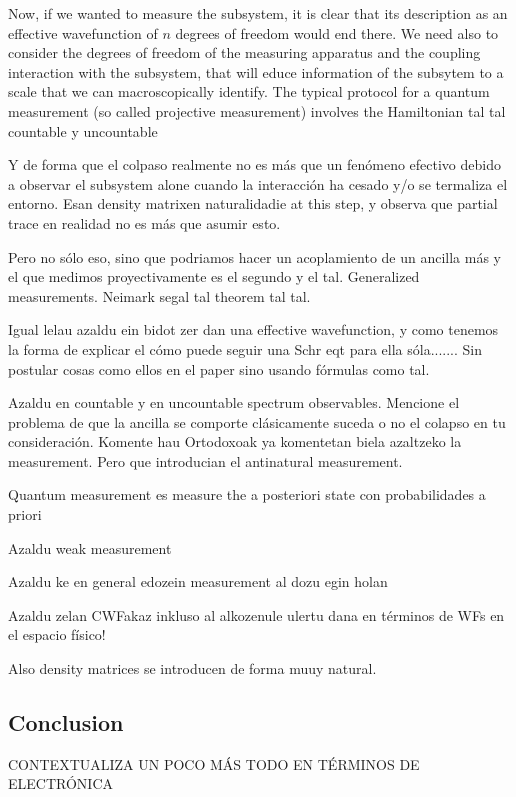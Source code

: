 \documentclass[11pt, a4paper]{article} %
\begin{document}
Now, if we wanted to measure the subsystem, it is clear that its description as an effective wavefunction of $n$ degrees of freedom would end there. We need also to consider the degrees of freedom of the measuring apparatus and the coupling interaction with the subsystem, that will educe information of the subsytem to a scale that we can macroscopically identify. The typical protocol for a quantum measurement (so called projective measurement) involves the Hamiltonian
tal tal countable y uncountable

Y de forma que el colpaso realmente no es más que un fenómeno efectivo debido a observar el subsystem alone cuando la interacción ha cesado y/o se termaliza el entorno. Esan density matrixen naturalidadie at this step, y observa que partial trace en realidad no es más que asumir esto.

Pero no sólo eso, sino que podriamos hacer un acoplamiento de un ancilla más y el que medimos proyectivamente es el segundo y el tal. Generalized measurements. Neimark segal tal theorem tal tal. 



Igual lelau azaldu ein bidot zer dan una effective wavefunction, y como tenemos la forma de explicar el cómo puede seguir una Schr eqt para ella sóla....... Sin postular cosas como ellos en el paper sino usando fórmulas como tal.

Azaldu en countable y en uncountable spectrum observables. Mencione el problema de que la ancilla se comporte clásicamente suceda o no el colapso en tu consideración. Komente hau Ortodoxoak ya komentetan biela azaltzeko la measurement. Pero que introducian el antinatural measurement.

Quantum measurement es measure the a posteriori state con probabilidades a priori

Azaldu weak measurement

Azaldu ke en general edozein measurement al dozu egin holan

Azaldu zelan CWFakaz inkluso al alkozenule ulertu  dana en términos de WFs en el espacio físico!

Also density matrices se introducen de forma muuy natural.

\subsection*{Conclusion}
CONTEXTUALIZA UN POCO MÁS TODO EN TÉRMINOS DE ELECTRÓNICA
\end{document}
